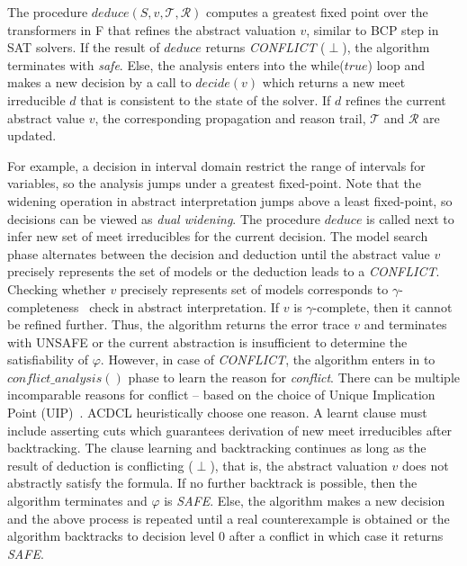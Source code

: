 The procedure $deduce(S,v,\mathcal{T},\mathcal{R})$ computes a greatest 
fixed point over the transformers in F that refines the abstract valuation 
$v$, similar to BCP step in SAT solvers.  If the result of $deduce$ 
returns {\em CONFLICT} ($\perp$), the algorithm terminates with {\em safe}. 
Else, the analysis enters into the while($true$) loop and makes a new decision 
by a call to $decide(v)$ which returns a new meet irreducible $d$ that is
consistent to the state of the solver.  If $d$ refines the current abstract 
value $v$, the corresponding propagation and reason trail, $\mathcal{T}$ 
and $\mathcal{R}$ are updated. 

For example, a decision in interval domain restrict the range of 
intervals for variables, so the analysis jumps under a 
greatest fixed-point. Note that the widening operation in abstract interpretation 
jumps above a least fixed-point, so decisions can be viewed as 
{\em dual widening}.  The procedure $deduce$ is called next to infer new 
set of meet irreducibles for the current decision.  The model search phase 
alternates between the decision and deduction until the abstract value $v$ 
precisely represents the set of models or the deduction leads to a {\em CONFLICT}.  
Checking whether $v$ precisely represents set of models corresponds to 
$\gamma$-completeness~\cite{dhk2013-popl} check in abstract interpretation.  
If $v$ is $\gamma$-complete, then it cannot be refined further.  Thus, the 
algorithm returns the error trace $v$ and terminates with UNSAFE or the 
current abstraction is insufficient to determine the satisfiability of $\varphi$.  
However, in case of {\em CONFLICT}, the algorithm enters in to 
$conflict\_analysis()$ phase to learn the reason for {\em conflict}.  
There can be multiple incomparable reasons for conflict -- based on 
the choice of Unique Implication Point (UIP)~\cite{cdcl}.  ACDCL heuristically 
choose one reason.  A learnt clause must include asserting cuts which 
guarantees derivation of new meet irreducibles after backtracking. The clause 
learning and backtracking continues as long as the result of deduction 
is conflicting ($\perp$), that is, the abstract valuation $v$ does not
abstractly satisfy the formula.  If no further backtrack is possible, 
then the algorithm terminates and $\varphi$ is {\em SAFE}. Else, the 
algorithm makes a new decision and the above process is repeated 
until a real counterexample is obtained or the algorithm backtracks to 
decision level 0 after a conflict in which case it returns {\em SAFE}. 

